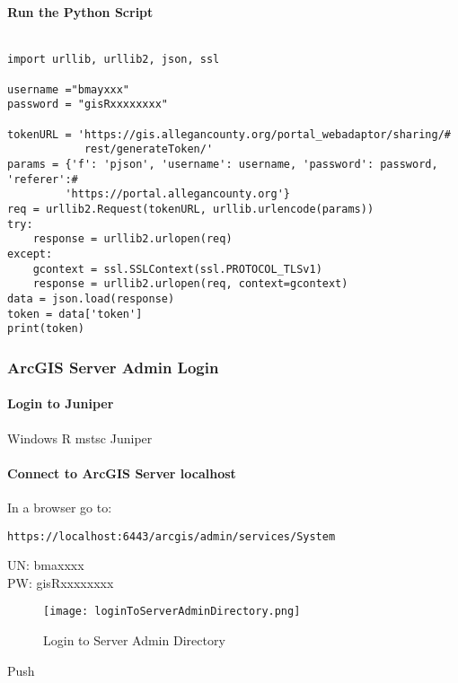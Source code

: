 \paragraph{Run the Python Script}

\begin{verbatim}

import urllib, urllib2, json, ssl

username ="bmayxxx"
password = "gisRxxxxxxxx"

tokenURL = 'https://gis.allegancounty.org/portal_webadaptor/sharing/#
            rest/generateToken/'
params = {'f': 'pjson', 'username': username, 'password': password, 'referer':#
         'https://portal.allegancounty.org'}
req = urllib2.Request(tokenURL, urllib.urlencode(params))
try:
    response = urllib2.urlopen(req)
except:
    gcontext = ssl.SSLContext(ssl.PROTOCOL_TLSv1)
    response = urllib2.urlopen(req, context=gcontext)
data = json.load(response)
token = data['token']
print(token)

\end{verbatim}

{\bigbtn{}}

\clearpage

\subsubsection{ArcGIS Server Admin Login}

\paragraph{Login to Juniper}

\noindent Windows R  {\rtArrow}  mstsc {\rtArrow} Juniper

\paragraph{Connect to ArcGIS Server localhost}

\noindent In a browser go to:

\begin{verbatim}
https://localhost:6443/arcgis/admin/services/System
\end{verbatim} 
UN: bmaxxxx\\
PW: gisRxxxxxxxx\\
{\bigbtn{}}
 \begin{figure}[h!]
 \centering
     \texttt{[image: loginToServerAdminDirectory.png]}
\vspace{-.7in} 
 \caption{Login to Server Admin Directory}
 \end{figure}

{\bigbtn Push }

\clearpage
%
%

